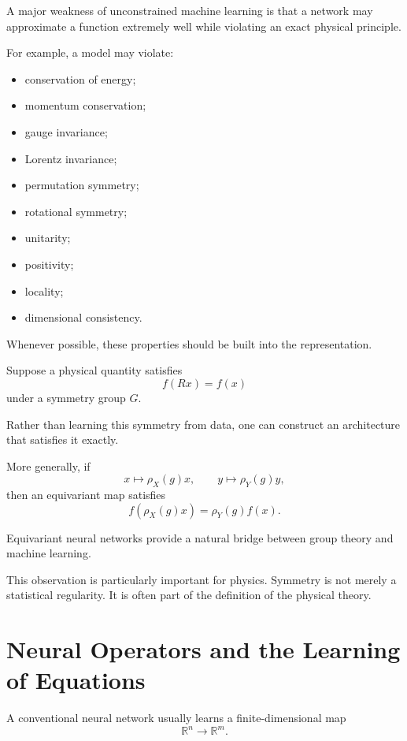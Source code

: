 \documentclass[11pt,a4paper]{article}
\begin{document}
A major weakness of unconstrained machine learning is that a network may
approximate a function extremely well while violating an exact physical
principle.

For example, a model may violate:

\begin{itemize}
\item conservation of energy;
\item momentum conservation;
\item gauge invariance;
\item Lorentz invariance;
\item permutation symmetry;
\item rotational symmetry;
\item unitarity;
\item positivity;
\item locality;
\item dimensional consistency.
\end{itemize}

Whenever possible, these properties should be built into the representation.

Suppose a physical quantity satisfies
\begin{equation}
f(Rx)=f(x)
\end{equation}
under a symmetry group $G$.

Rather than learning this symmetry from data, one can construct an architecture
that satisfies it exactly.

More generally, if
\begin{equation}
x\mapsto \rho_X(g)x,
\qquad
y\mapsto \rho_Y(g)y,
\end{equation}
then an equivariant map satisfies
\begin{equation}
f(\rho_X(g)x)=
\rho_Y(g)f(x).
\end{equation}

Equivariant neural networks provide a natural bridge between group theory and
machine learning.

This observation is particularly important for physics. Symmetry is not merely
a statistical regularity. It is often part of the definition of the physical
theory.

\section{Neural Operators and the Learning of Equations}

A conventional neural network usually learns a finite-dimensional map
\begin{equation}
\mathbb{R}^n\rightarrow\mathbb{R}^m.
\end{equation}
\end{document}
